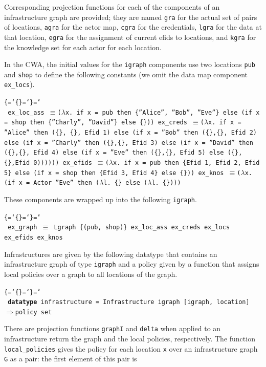 \documentclass{llncs}
\newenvironment{ttbox}{\begin{alltt}\ttbraces\small\tt}%
                      {\end{alltt}}
\def\ttbraces{\let\.=\nobreak\chardef\{=`\{\chardef\}=`\}\chardef\|=`\\}
\newcommand\ttfun{\mbox{{$\Rightarrow$}}}
\newcommand\ttequiv{\mbox{{$\equiv$}}}
\newcommand\ttlam{\mbox{\( \lambda \)}}
\begin{document}
Corresponding projection functions for each of the components of an 
infrastructure graph are provided; they are named \texttt{gra} for the actual 
set of pairs of locations, \texttt{agra} for the actor map, \texttt{cgra} for 
the credentials, \texttt{lgra} for the %
data at that location, \texttt{egra} for the assignment of current efids to locations,
and \texttt{kgra} for the knowledge set for each actor for each location.

In the CWA, the initial values for the \texttt{igraph} components use
two locations \texttt{pub} and \texttt{shop} to define the following constants (we omit the
data map component \texttt{ex\_locs}).
\begin{ttbox}
ex_loc_ass \ttequiv (\ttlam x. if x = pub then \{''Alice'', ''Bob'', ''Eve''\}  
                 else (if x = shop then \{''Charly'', ''David''\} 
                 else \{\}))
ex_creds \ttequiv (\ttlam x. if x = ''Alice'' then (\{\}, \{\}, Efid 1) else 
              (if x = ''Bob'' then  (\{\},\{\}, Efid 2) else 
              (if x = ''Charly'' then (\{\},\{\}, Efid 3) else
              (if x = ''David'' then (\{\},\{\}, Efid 4) else
              (if x = ''Eve'' then (\{\},\{\}, Efid 5)
               else (\{\},\{\},Efid 0))))))
ex_efids \ttequiv (\ttlam x. if x = pub then \{Efid 1, Efid 2, Efid 5\}
                  else (if x = shop then \{Efid 3, Efid 4\} else \{\}))
ex_knos \ttequiv (\ttlam x. (if x = Actor ''Eve'' then (\ttlam l. \{\} else (\ttlam l. \{\})))
\end{ttbox}  
These components are wrapped up into the following \texttt{igraph}.
\begin{ttbox}
ex_graph \ttequiv
      Lgraph \{(pub, shop)\} ex_loc_ass ex_creds ex_locs ex_efids ex_knos
\end{ttbox}  
Infrastructures are given by the following datatype that 
contains an infrastructure graph of type \texttt{igraph} 
and a policy given by a function that assigns local policies over a graph to
all locations of the graph. 
\begin{ttbox}
{\bf{datatype}} infrastructure = Infrastructure igraph 
                                         [igraph, location] \ttfun policy set
\end{ttbox}
There are projection functions \texttt{graphI} and \texttt{delta} when applied
to an infrastructure return the graph and the local policies, respectively.
The function \texttt{local\_policies} gives the policy for each location \texttt{x}
over an infrastructure graph \texttt{G} as a pair: the first element of this pair is 
\end{document}
